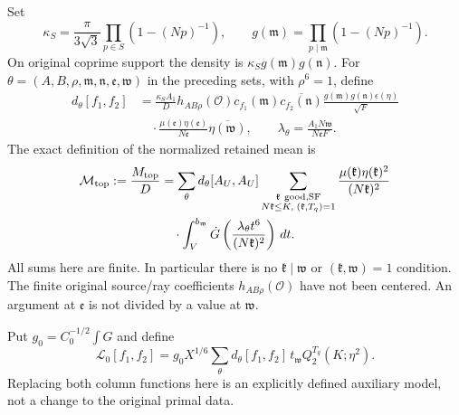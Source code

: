 Set
\begin{equation}\label{gtl:density}
 \kappa_S=\frac{\pi}{3\sqrt3}\prod_{p\in S}(1-(Np)^{-1}),
 \qquad
 g(\mathfrak m)=\prod_{p\mid\mathfrak m}(1-(Np)^{-1}).
\end{equation}
On original coprime support the density is
$\kappa_Sg(\mathfrak m)g(\mathfrak n)$.
For $\theta=(A,B,\rho,\mathfrak m,\mathfrak n,\mathfrak e,\mathfrak w)$
in the preceding sets, with $\rho^6=1$, define
\begin{equation}\label{gtl:outer-coefficient}
 \begin{aligned}
 d_\theta[f_1,f_2]
 &=\frac{\kappa_S A_1}{D}h_{AB\rho}(\mathcal O)
     c_{f_1}(\mathfrak m)\overline{c_{f_2}(\mathfrak n)}
     \frac{g(\mathfrak m)g(\mathfrak n)\epsilon(\eta)}{\sqrt F}\\
 &\quad\cdot
      \frac{\mu(\mathfrak e)\eta(\mathfrak e)}{N\mathfrak e}
                       \overline{\eta(\mathfrak w)},\qquad
 \lambda_\theta=\frac{A_1N\mathfrak w}{N\mathfrak e F}.
 \end{aligned}
\end{equation}
The exact definition of the normalized retained mean is
\begin{equation}\label{gtl:actual-mean}
 \begin{aligned}
 \mathcal M_{\rm top}
 :=\frac{M_{\rm top}}D
 &=\sum_\theta d_\theta[A_U,A_U]
     \sum_{\substack{\mathfrak k\ {\rm good,SF}\\N\mathfrak k\le K,\;(\mathfrak k,T_q)=1}}
       \frac{\mu(\mathfrak k)\eta(\mathfrak k)^2}
            {(N\mathfrak k)^2}\\
 &\quad\cdot\int_V^{b_{\mathfrak w}}
       \dot G\left(\frac{\lambda_\theta t^6}
                         {(N\mathfrak k)^2}\right)\,dt .
 \end{aligned}
\end{equation}
All sums here are finite. In particular there is no
$\mathfrak k\mid\mathfrak w$ or $(\mathfrak k,\mathfrak w)=1$
condition. The finite original source/ray coefficients
$h_{AB\rho}(\mathcal O)$ have not been centered.
An argument at $\mathfrak e$ is not divided by a value at
$\mathfrak w$.

Put $g_0=C_0^{-1/2}\int G$ and define
\begin{equation}\label{gtl:leading-model}
 \mathcal L_0[f_1,f_2]
  =g_0X^{1/6}
      \sum_\theta d_\theta[f_1,f_2]\,t_{\mathfrak w}
                             Q_2^{T_q}(K;\eta^2).
\end{equation}
Replacing both column functions here is an explicitly defined
auxiliary model, not a change to the original primal data.

